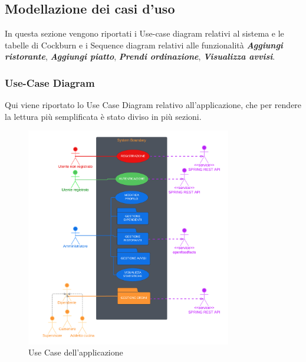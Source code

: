 \subsection{Modellazione dei casi d'uso}

    \begin{flushleft}
        In questa sezione vengono riportati i Use-case diagram relativi al sistema e le tabelle di Cockburn e i Sequence diagram relativi alle funzionalità \textit{\textbf{Aggiungi ristorante}}, \textit{\textbf{Aggiungi piatto}}, \textit{\textbf{Prendi ordinazione}}, \textit{\textbf{Visualizza avvisi}}.
    \end{flushleft}

    \subsubsection{Use-Case Diagram}
        \begin{flushleft}
            Qui viene riportato lo Use Case Diagram relativo all'applicazione, che per rendere la lettura più semplificata 
            è stato diviso in più sezioni.
        \end{flushleft}
        
        \begin{figure}[H]
            \centering
            \includegraphics[width=0.8\textwidth]{assets/diagrammi/Use-Case/Use-Case Generale.png}
            \caption{Use Case dell'applicazione}
            \label{fig:ucdGenerale}
        \end{figure}
        
